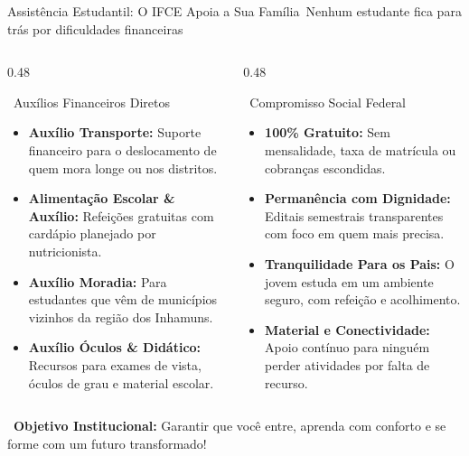 
\begin{frame}{Assistência Estudantil: O IFCE Apoia a Sua Família}{\faHands\ Nenhum estudante fica para trás por dificuldades financeiras}
  \begin{columns}[t]
    \begin{column}{0.48\textwidth}
      \begin{bluecard}{\faHandHoldingUsd\ Auxílios Financeiros Diretos}
        \tiny
        \begin{itemize}\setlength{\itemsep}{0.18em}
          \item \textbf{Auxílio Transporte:} Suporte financeiro para o deslocamento de quem mora longe ou nos distritos.
          \item \textbf{Alimentação Escolar \& Auxílio:} Refeições gratuitas com cardápio planejado por nutricionista.
          \item \textbf{Auxílio Moradia:} Para estudantes que vêm de municípios vizinhos da região dos Inhamuns.
          \item \textbf{Auxílio Óculos \& Didático:} Recursos para exames de vista, óculos de grau e material escolar.
        \end{itemize}
      \end{bluecard}
    \end{column}
    
    \begin{column}{0.48\textwidth}
      \begin{greencard}{\faCheckCircle\ Compromisso Social Federal}
        \tiny
        \begin{itemize}\setlength{\itemsep}{0.18em}
          \item \textbf{100\% Gratuito:} Sem mensalidade, taxa de matrícula ou cobranças escondidas.
          \item \textbf{Permanência com Dignidade:} Editais semestrais transparentes com foco em quem mais precisa.
          \item \textbf{Tranquilidade Para os Pais:} O jovem estuda em um ambiente seguro, com refeição e acolhimento.
          \item \textbf{Material e Conectividade:} Apoio contínuo para ninguém perder atividades por falta de recurso.
        \end{itemize}
      \end{greencard}
    \end{column}
  \end{columns}
  
  \vspace{0.08cm}
  \begin{statcard}
    \tiny \textcolor{IFCEDarkGreen}{\faCheckDouble\ \textbf{Objetivo Institucional:} Garantir que você entre, aprenda com conforto e se forme com um futuro transformado!}
  \end{statcard}
\end{frame}

